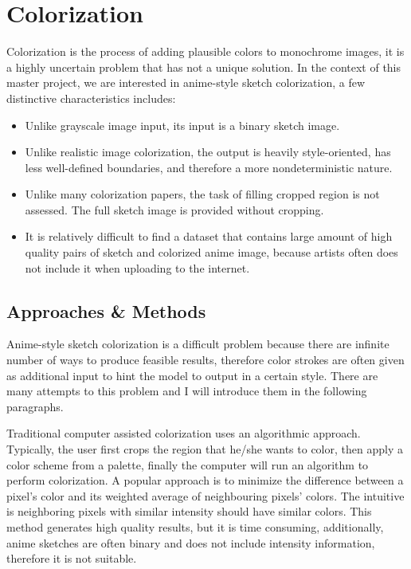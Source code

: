 \chapter{Colorization}
\label{chapterlabel3}

Colorization is the process of adding plausible colors to monochrome images, it is a highly uncertain problem that has not a unique solution. In the context of this master project, we are interested in anime-style sketch colorization, a few distinctive characteristics includes:

\begin{itemize}
    \item Unlike grayscale image input, its input is a binary sketch image.
    \item Unlike realistic image colorization, the output is heavily style-oriented, has less well-defined boundaries, and therefore a more nondeterministic nature.
    \item Unlike many colorization papers, the task of filling cropped region is not assessed. The full sketch image is provided without cropping.
    \item It is relatively difficult to find a dataset that contains large amount of high quality pairs of sketch and colorized anime image, because artists often does not include it when uploading to the internet.
\end{itemize}


\section{Approaches \& Methods}
Anime-style sketch colorization is a difficult problem because there are infinite number of ways to produce feasible results, therefore color strokes are often given as additional input to hint the model to output in a certain style. There are many attempts to this problem and I will introduce them in the following paragraphs.

Traditional computer assisted colorization uses an algorithmic approach. Typically, the user first crops the region that he/she wants to color, then apply a color scheme from a palette, finally the computer will run an algorithm to perform colorization. A popular approach is to minimize the difference between a pixel's color and its weighted average of neighbouring pixels' colors.\cite{levinColorizationUsingOptimizationb} The intuitive is neighboring pixels with similar intensity should have similar colors. This method generates high quality results, but it is time consuming, additionally, anime sketches are often binary and does not include intensity information, therefore it is not suitable.



